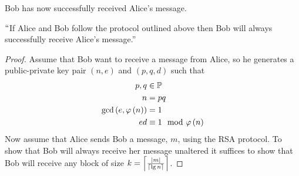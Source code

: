 \begin{definition}
\begin{itemize}
                    Bob has now successfully received Alice's message.
            \end{itemize}
            \begin{claim}
                $``$If Alice and Bob follow the protocol outlined above then Bob
                will always successfully receive Alice's message.''
            \end{claim}
            \begin{proof}
                Assume that Bob want to receive a message from Alice, so he generates a
                public-private key pair $(n, e)$ and $(p, q, d)$ such that
                \begin{align}
                    p, q & \in \set{P} \\
                    n & = pq \\
                    \gcd{e}{\eulerphi{n}} & = 1 \\
                    \label{ed requirement}
                    ed & \equiv 1 \mod \eulerphi{n}
                \end{align}
                Now assume that Alice sends Bob a message, $m$, using the RSA protocol. To show
                that Bob will always receive her message unaltered it suffices to show that
                Bob will receive any block of size $k = \left\lceil \frac{\left|m\right|}{\left\lceil \lg n \right\rceil} \right\rceil$.


\end{proof}
\end{definition}
